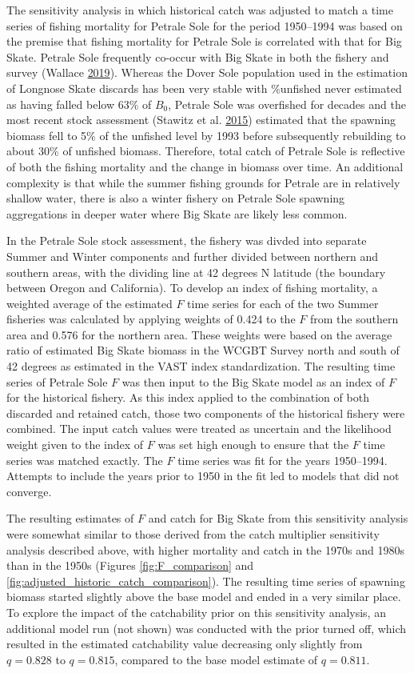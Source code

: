 \documentclass[12pt,]{article}
\begin{document}
The sensitivity analysis in which historical catch was adjusted to match
a time series of fishing mortality for Petrale Sole for the period
1950--1994 was based on the premise that fishing mortality for Petrale
Sole is correlated with that for Big Skate. Petrale Sole frequently
co-occur with Big Skate in both the fishery and survey (Wallace
\protect\hyperlink{ref-Wallace2019}{2019}). Whereas the Dover Sole
population used in the estimation of Longnose Skate discards has been
very stable with \%unfished never estimated as having falled below 63\%
of \(B_0\), Petrale Sole was overfished for decades and the most recent
stock assessment (Stawitz et al.
\protect\hyperlink{ref-Stawitz2015}{2015}) estimated that the spawning
biomass fell to 5\% of the unfished level by 1993 before subsequently
rebuilding to about 30\% of unfished biomass. Therefore, total catch of
Petrale Sole is reflective of both the fishing mortality and the change
in biomass over time. An additional complexity is that while the summer
fishing grounds for Petrale are in relatively shallow water, there is
also a winter fishery on Petrale Sole spawning aggregations in deeper
water where Big Skate are likely less common.

In the Petrale Sole stock assessment, the fishery was divded into
separate Summer and Winter components and further divided between
northern and southern areas, with the dividing line at 42 degrees N
latitude (the boundary between Oregon and California). To develop an
index of fishing mortality, a weighted average of the estimated \(F\)
time series for each of the two Summer fisheries was calculated by
applying weights of 0.424 to the \(F\) from the southern area and 0.576
for the northern area. These weights were based on the average ratio of
estimated Big Skate biomass in the WCGBT Survey north and south of 42
degrees as estimated in the VAST index standardization. The resulting
time series of Petrale Sole \(F\) was then input to the Big Skate model
as an index of \(F\) for the historical fishery. As this index applied
to the combination of both discarded and retained catch, those two
components of the historical fishery were combined. The input catch
values were treated as uncertain and the likelihood weight given to the
index of \(F\) was set high enough to ensure that the \(F\) time series
was matched exactly. The \(F\) time series was fit for the years
1950--1994. Attempts to include the years prior to 1950 in the fit led
to models that did not converge.

The resulting estimates of \(F\) and catch for Big Skate from this
sensitivity analysis were somewhat similar to those derived from the
catch multiplier sensitivity analysis described above, with higher
mortality and catch in the 1970s and 1980s than in the 1950s (Figures
\ref{fig:F_comparison} and
\ref{fig:adjusted_historic_catch_comparison}). The resulting time series
of spawning biomass started slightly above the base model and ended in a
very similar place. To explore the impact of the catchability prior on
this sensitivity analysis, an additional model run (not shown) was
conducted with the prior turned off, which resulted in the estimated
catchability value decreasing only slightly from \(q = 0.828\) to
\(q = 0.815\), compared to the base model estimate of \(q = 0.811\).
\end{document}
